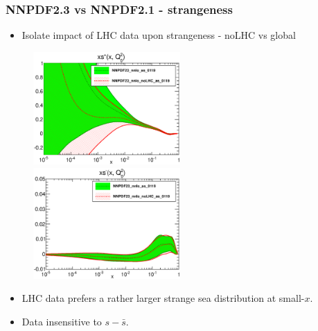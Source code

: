 \documentclass[10pt]{beamer}
\begin{document}
\begin{frame}
\frametitle{NNPDF2.3 vs NNPDF2.1 - strangeness}
\begin{itemize}
\item<1-> Isolate impact of LHC data upon strangeness - noLHC vs global
\end{itemize}

 \begin{figure}[b!]
    \begin{center}
         \includegraphics[width=0.50\textwidth]{pdf_xsplus_log_band_comparison.eps}
      \includegraphics[width=0.50\textwidth]{pdf_xsminus_log_band_comparison.eps}
    \end{center}
    \vskip-0.5cm
\end{figure}
\vskip15pt

\begin{itemize}
\item<1-> LHC data prefers a rather larger strange sea distribution at small-$x$.
\item<1->  Data insensitive to $s-\bar{s}$.
\end{itemize}

\end{frame}
\end{document}
